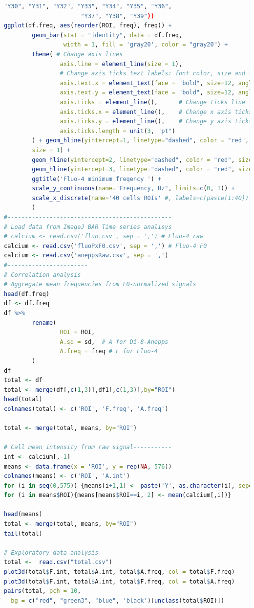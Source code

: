 \documentclass{biophys-new}
\begin{document}
\begin{lstlisting}[language=R]
                      "Y30", "Y31", "Y32", "Y33", "Y34", "Y35", "Y36",
                      "Y37", "Y38", "Y39"))
ggplot(df.freq, aes(reorder(ROI, freq), freq)) +
        geom_bar(stat = "identity", data = df.freq,
                 width = 1, fill = 'gray20', color = "gray20") +
        theme( # Change axis lines
                axis.line = element_line(size = 1),
                # Change axis ticks text labels: font color, size and face
                axis.text.x = element_text(face = "bold", size=12, angle=90),
                axis.text.y = element_text(face = "bold", size=12, angle=0),
                axis.ticks = element_line(),      # Change ticks line
                axis.ticks.x = element_line(),    # Change x axis ticks only
                axis.ticks.y = element_line(),    # Change y axis ticks only
                axis.ticks.length = unit(3, "pt")
        ) + geom_hline(yintercept=1, linetype="dashed", color = "red",
        size = 1) +
        geom_hline(yintercept=2, linetype="dashed", color = "red", size = 1) +
        geom_hline(yintercept=3, linetype="dashed", color = "red", size = 1) +
        ggtitle('Fluo-4 minimum freqency ') +
        scale_y_continuous(name="Frequency, Hz", limits=c(0, 1)) +
        scale_x_discrete(name='40 cells ROIs' #, labels=c(paste(1:40))
        )
#-----------------------------------------------
# Load data from ImageJ BAR Time series analisys
# calcium <- read.csv('fluo.csv', sep = ',') # Fluo-4 raw
calcium <- read.csv('fluoPxF0.csv', sep = ',') # Fluo-4 F0
calcium <- read.csv('aneppsRaw.csv', sep = ',')
#-----------------------
# Correlation analysis
# Aggregate mean frequencies from F0-normalized signals
head(df.freq)
df <- df.freq
df %>%
        rename(
                ROI = ROI,
                A.sd = sd,  # A for Di-8-Anepps
                A.freq = freq # F for Fluo-4
        )
df
total <- df
total <- merge(df[,c(1,3)],df1[,c(1,3)],by="ROI")
head(total)
colnames(total) <- c('ROI', 'F.freq', 'A.freq')

total <- merge(total, means, by="ROI")

# Call mean intensity from raw signal-----------
int <- calcium[,-1]
means <- data.frame(x = 'ROI', y = rep(NA, 576))
colnames(means) <- c('ROI', 'A.int')
for (i in seq(0,575)) {means[i+1,1] <- paste('Y', as.character(i), sep="")}
for (i in means$ROI){means[means$ROI==i, 2] <- mean(calcium[,i])}

head(means)
total <- merge(total, means, by="ROI")
tail(total)

# Exploratory data analysis---
total <-  read.csv("total.csv")
plot3d(total$F.int, total$A.int, total$A.freq, col = total$F.freq)
plot3d(total$F.int, total$A.int, total$F.freq, col = total$A.freq)
pairs(total, pch = 10,
  bg = c("red", "green3", "blue", 'black')[unclass(total$ROI)])


\end{lstlisting}
\end{document}
